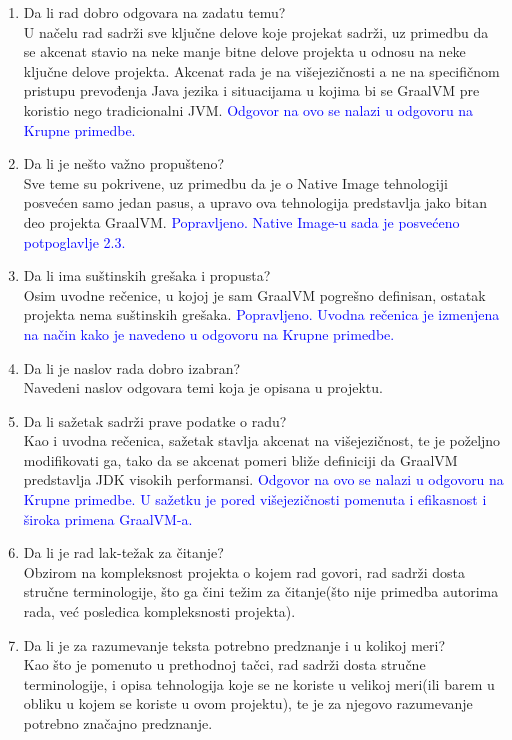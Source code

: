 \documentclass[a4paper]{report}
\newcommand{\odgovor}[1]{\textcolor{blue}{#1}}
\begin{document}
\begin{enumerate}
\item Da li rad dobro odgovara na zadatu temu?\\
U načelu rad sadrži sve ključne delove koje projekat sadrži, uz primedbu da se akcenat stavio na neke manje bitne delove projekta u odnosu na 
neke ključne delove projekta. Akcenat rada je na višejezičnosti a ne na specifičnom pristupu prevođenja Java jezika i situacijama u kojima bi 
se GraalVM pre koristio nego tradicionalni JVM. 
\odgovor{Odgovor na ovo se nalazi u odgovoru na Krupne primedbe.}

\item Da li je nešto važno propušteno?\\
Sve teme su pokrivene, uz primedbu da je o Native Image tehnologiji posvećen samo jedan pasus, a upravo ova tehnologija predstavlja jako bitan 
deo projekta GraalVM. \odgovor{Popravljeno. Native Image-u sada je posvećeno potpoglavlje 2.3.}

\item Da li ima suštinskih grešaka i propusta?\\
Osim uvodne rečenice, u kojoj je sam GraalVM pogrešno definisan, ostatak projekta nema suštinskih grešaka. \odgovor{Popravljeno. Uvodna rečenica je izmenjena na način kako je navedeno u odgovoru na Krupne primedbe.}

\item Da li je naslov rada dobro izabran?\\
Navedeni naslov odgovara temi koja je opisana u projektu.

\item Da li sažetak sadrži prave podatke o radu?\\
Kao i uvodna rečenica, sažetak stavlja akcenat na višejezičnost, te je poželjno modifikovati ga, tako da se akcenat pomeri bliže definiciji da 
GraalVM predstavlja JDK visokih performansi. \odgovor{Odgovor na ovo se nalazi u odgovoru na Krupne primedbe. U sažetku je pored višejezičnosti pomenuta i efikasnost i široka primena GraalVM-a.}

\item Da li je rad lak-težak za čitanje?\\
Obzirom na kompleksnost projekta o kojem rad govori, rad sadrži dosta stručne terminologije, što ga čini težim za čitanje(što nije primedba 
autorima rada, već posledica kompleksnosti projekta).

\item Da li je za razumevanje teksta potrebno predznanje i u kolikoj meri?\\
Kao što je pomenuto u prethodnoj tačci, rad sadrži dosta stručne terminologije, i opisa tehnologija koje se ne koriste u velikoj meri(ili barem 
u obliku u kojem se koriste u ovom projektu), te je za njegovo razumevanje potrebno značajno predznanje.


\end{enumerate}
\end{document}
